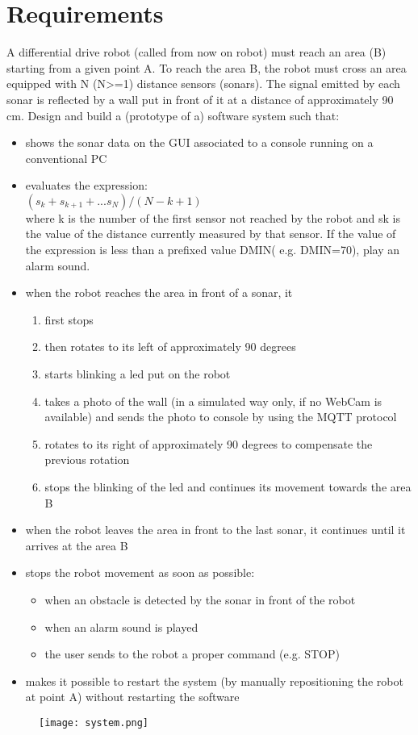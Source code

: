 \section{Requirements}
A differential drive robot (called from now on robot) must reach an area (B) starting from a given point A. To reach the area B, the robot must cross an area equipped with N (N>=1) distance sensors (sonars). The signal emitted by each sonar is reflected by a wall put in front of it at a distance of approximately 90 cm.
Design and build a (prototype of a) software system such that:
\begin{itemize}
	\item shows the sonar data on the GUI associated to a console running on a conventional PC
	\item evaluates the expression: \\
			$ (s_{k} + s_{k+1} + ... s_{N}) / (N-k+1) $ \\
			where k is the number of the first sensor not reached by the robot and sk is the value of the distance currently measured by that sensor. If the value of the expression is less than a prefixed value DMIN( e.g. DMIN=70), play an alarm sound.
	\item when the robot reaches the area in front of a sonar, it
			\begin{enumerate}
				\item first stops
				\item then rotates to its left of approximately 90 degrees
				\item starts blinking a led put on the robot
				\item takes a photo of the wall (in a simulated way only, if no WebCam is available) and sends the photo to console by using the MQTT protocol
				\item rotates to its right of approximately 90 degrees to compensate the previous rotation
				\item stops the blinking of the led and continues its movement towards the area B
			\end{enumerate}
	\item when the robot leaves the area in front to the last sonar, it continues until it arrives at the area B
	\item stops the robot movement as soon as possible:
	\begin{itemize}
		\item when an obstacle is detected by the sonar in front of the robot
		\item when an alarm sound is played
		\item the user sends to the robot a proper command (e.g. STOP)
	\end{itemize}
	\item makes it possible to restart the system (by manually repositioning the robot at point A) without restarting the software
\end{itemize}

\begin{figure}[h]
	\centering
	\texttt{[image: system.png]}
\end{figure}
